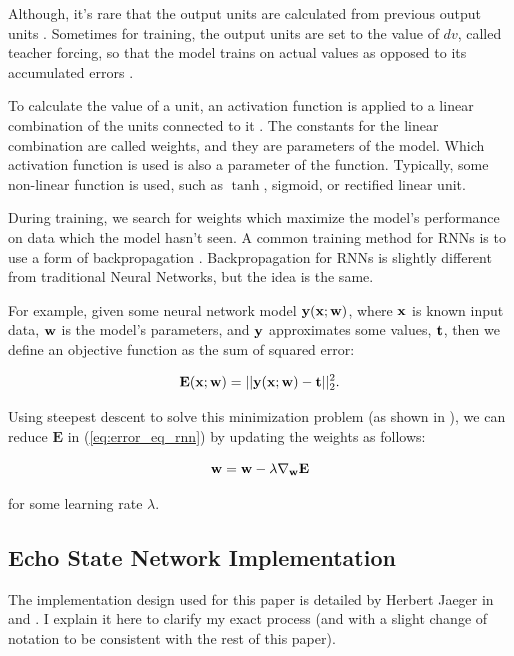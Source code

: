 \documentclass{article}
\begin{document}
Although, it's rare that the output units are calculated from previous 
output units \cite{jaeger2002tutorial}. Sometimes for training, the output 
units are set to the value of $dv$, called teacher forcing, so that the 
model trains on actual values as opposed to its accumulated errors 
\cite{jaeger2002tutorial}.

To calculate the value of a unit, an activation function is applied to a 
linear combination of the units connected to it \cite{svozil1997introduction}. The constants for the 
linear combination are called weights, and they are parameters of the 
model. Which activation function is used is also a parameter of the 
function. Typically, some non-linear function is used, such as $\tanh$, 
sigmoid, or rectified linear unit.

During training, we search for
weights which maximize the model's performance on data
which the model hasn't seen. A common training method for RNNs
is to use a form of backpropagation \cite{jaeger2002tutorial}. 
Backpropagation for RNNs is slightly different from traditional Neural Networks, but the idea is the same.

For example, given some neural network model $\mathbf{y}(\mathbf{x}; \mathbf{w})$, where
$\mathbf{x}$ is known input data, $\mathbf{w}$ is the model's parameters, and $\mathbf{y}$ 
approximates some values, $\mathbf{t}$, then we define an objective 
function as the sum of squared error:

\newcommand{\Ev}{\mathbf{E}}

\begin{equation}
    \Ev(\xv; \wv) = \vert \vert \yv(\xv; \wv) - \tv \vert \vert_2^2.
    \label{eq:error_eq_rnn}
\end{equation}

Using steepest descent to solve this minimization problem (as shown in 
\cite{svozil1997introduction}), we can
reduce $\Ev$ in (\ref{eq:error_eq_rnn}) by
updating the weights as follows:

\begin{equation}
    \wv = \wv - \lambda \nabla_\wv \Ev
\end{equation}

for some learning rate $\lambda$.

\subsection{Echo State Network Implementation}

The implementation design used for this paper is detailed by Herbert Jaeger
in \cite{jaeger2002tutorial} and \cite{jaeger2007echo}. I explain it here 
to clarify my exact process (and with a slight change of notation to be 
consistent with the rest of this paper).
\end{document}
